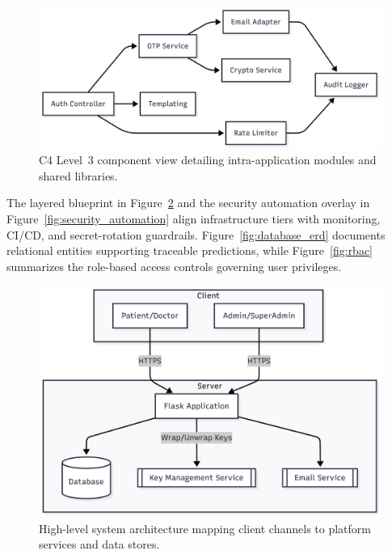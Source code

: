 \documentclass[conference]{IEEEtran}
\begin{document}
\begin{figure}[t]
  \centering
  \includegraphics[width=0.9\linewidth]{c4_level_3_components.png}
  \caption{C4 Level~3 component view detailing intra-application modules and shared libraries.}
  \label{fig:c4_components}
\end{figure}

The layered blueprint in Figure~\ref{fig:system_arch} and the security automation overlay in Figure~\ref{fig:security_automation} align infrastructure tiers with monitoring, CI/CD, and secret-rotation guardrails. Figure~\ref{fig:database_erd} documents relational entities supporting traceable predictions, while Figure~\ref{fig:rbac} summarizes the role-based access controls governing user privileges.

\begin{figure}[t]
  \centering
  \includegraphics[width=0.9\linewidth]{high_level_system_architecture.png}
  \caption{High-level system architecture mapping client channels to platform services and data stores.}
  \label{fig:system_arch}
\end{figure}
\end{document}
